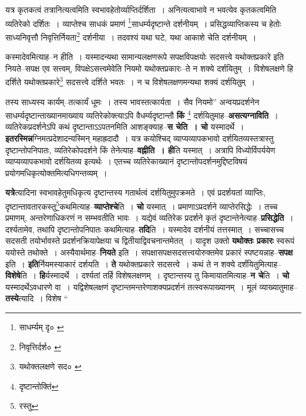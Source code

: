 \documentclass[article,12pt,a4paper]{memoir}
\begin{document}
	यत्र कृतकत्वं तत्रानित्यत्वमिति स्वभावहेतोर्व्याप्तिर्दर्शिता । अनित्यत्वाभावे न भवत्येव कृतकत्वमिति व्यतिरेको दर्शितः । व्याप्तेश्च साधकं प्रमाणं \footnote{साधर्म्यम् दृ० \cite{dp-msB}}\-साधर्म्यदृष्टान्ते दर्शनीयम् । प्रसिद्धव्याप्तिकस्य च हेतोः साध्यनिवृत्तौ निवृत्तिर्नियता\footnote{निवृत्तिर्दर्श० \cite{dp-msA} \cite{dp-msB} \cite{dp-msD} \cite{dp-edP} \cite{dp-edH} \cite{dp-edN} \cite{dp-edE}} दर्शनीया । तदवश्यं यथा घटे, यथा आकाशे चेति दर्शनीयम् । 
	  
	कस्मादेवमित्याह--न हीति । यस्मादन्यथा सामान्यलक्षणरूपे सपक्षविपक्षयोः सदसत्त्वे यथोक्तप्रकारे इति नियते--सपक्ष एव सत्त्वम्, विपक्षेऽसत्त्वमेवेति नियमो यथोक्तप्रकारः--ते न शक्ये दर्शयितुम् । विशेषलक्षणे हि दर्शिते यथोक्तप्रकारे\footnote{यथोक्तलक्षणे सद० \cite{dp-msC}} सदसत्त्वे दर्शिते भवतः । न च विशेषलक्षणमन्यथा शक्यं दर्शयितुम् । 
	  
	तस्य साध्यस्य कार्यम्--तत्कार्यं धूमः । तस्य भावस्तत्कार्यता । सैव नियमो” अन्वयप्रदर्शनेन साधर्म्यदृष्टान्ताख्यानमाख्याय व्यतिरेकोक्त्याऽपि वैधर्म्यदृष्टान्तौ \textbf{किं} \footnote{दृष्टान्तोक्तिं} दर्शयितुमाह--\textbf{असत्यग्नाविति} । व्यतिरेकप्रदर्शनेऽपि कथं दृष्टान्ताऽऽपतनमिति आशङ्क्याह--\textbf{स चेति । चो} यस्मादर्थे । \textbf{इतरस्मिन्न}ग्निमत्प्रदेशादन्यस्मिन् महाह्रदादौ । यत्र कयोश्चिद् व्याप्यव्यापकभावो दर्शयितव्यस्तत्रास्तु दृष्टान्तोपनिपातः, व्यतिरेकोपदर्शने किं तेनेत्याह--\textbf{वह्नीति । ही}ति यस्मात् । अत्रापि विध्योर्विपर्ययेण व्याप्यव्यापकभावो दर्शयितव्य इत्यर्थः । एतच्च व्यतिरेकाख्यानं दृष्टान्तोपदर्शनमुद्दिष्टविषयं प्रयोगमधिकृत्योक्तमित्यधिगन्तव्यम् ।
	\pend
      

	  \pstart \textbf{यत्रे}त्यादिना स्वभावहेतुमधिकृत्य दृष्टान्तस्य गतार्थत्वं दर्शयितुमुपक्रमते । एवं प्रदर्शयतां व्याप्तिः, दृष्टान्तावतारकस्तु\footnote{रस्तु}\-कथमित्याह--\textbf{व्याप्तेश्चे}ति । \textbf{चो} यस्मात् । प्रमाणाऽप्रदर्शने व्याप्तेरसिद्धेः । तच्च प्रमाणम्, अन्तरेणाधिकरणं न सम्भवतीति भावः । यद्येवं व्यतिरेक \leavevmode{} प्रदर्शने कृतं दृष्टान्तेनेत्याह--\textbf{प्रसिद्धेति} । दर्श्यतामेव, तथापि दृष्टान्तोपनिपातः कथमित्याह--\textbf{तदि}ति । यस्मादेव दर्शनीयं तत्तस्मात् । सच्चासच्च सदसती तयोर्भावस्ते प्रदर्शनक्रियापेक्षया च द्वितीयाद्विवचनान्तमेतत् । यादृश उक्तो \textbf{यथोक्तः प्रकारः} स्वरूपं ययोस्ते तथोक्ते । अस्यैवार्थमाह--\textbf{नियते} इति । सपक्षासपक्षसदसत्त्वयोरुक्तमेव प्रकारं स्पष्टयन्नाह--\textbf{सपक्ष} इति । \textbf{इति}र्नियमस्याकारं दर्शयति । \textbf{ते} यथोक्तप्रकारे सदसत्त्वे । कथं ते न शक्ये दर्शंयितुमित्याह--\textbf{विशेषे}ति । \textbf{हि}र्यस्मादर्थे । दर्श्यतां तर्हि विशेषलक्षणम् । दृष्टान्तस्य तु किमायातमित्याह--\textbf{न चे}ति । \textbf{चो} यस्मादर्थेऽवधारणे वा । यद्विशेषलक्षणं दृष्टान्तमन्तरेणाशक्यप्रदर्शनं तत्स्वरूपाख्यानम् । मूलं व्याख्यातुमाह--\textbf{तस्ये}त्यादि । विशेष  \leavevmode{} “
	  
\end{document}
